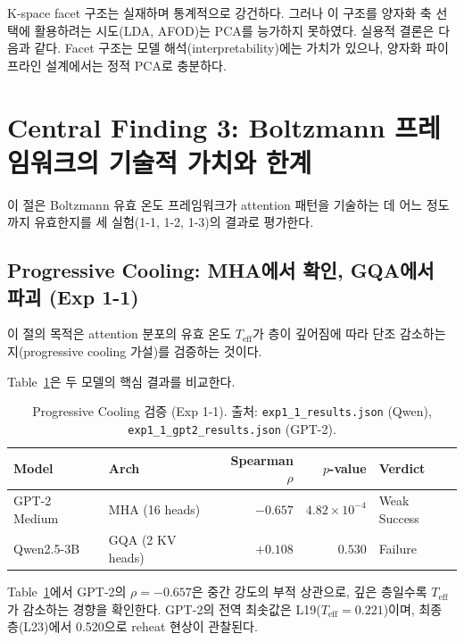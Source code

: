 \documentclass[11pt,a4paper]{article}
\newcommand{\teff}{T_\mathrm{eff}}
\begin{document}
K-space facet 구조는 실재하며 통계적으로 강건하다.
그러나 이 구조를 양자화 축 선택에 활용하려는 시도(LDA, AFOD)는 PCA를 능가하지 못하였다.
실용적 결론은 다음과 같다.
Facet 구조는 모델 해석(interpretability)에는 가치가 있으나, 양자화 파이프라인 설계에서는 정적 PCA로 충분하다.

\section{Central Finding 3: Boltzmann 프레임워크의 기술적 가치와 한계}

이 절은 Boltzmann 유효 온도 프레임워크가 attention 패턴을 기술하는 데 어느 정도까지 유효한지를 세 실험(1-1, 1-2, 1-3)의 결과로 평가한다.

\subsection{Progressive Cooling: MHA에서 확인, GQA에서 파괴 (Exp 1-1)}
\label{sec:exp11}

이 절의 목적은 attention 분포의 유효 온도 $\teff$가 층이 깊어짐에 따라 단조 감소하는지(progressive cooling 가설)를 검증하는 것이다.

Table~\ref{tab:exp11_main}은 두 모델의 핵심 결과를 비교한다.

\begin{table}[H]
\centering
\caption{Progressive Cooling 검증 (Exp 1-1). 출처: \texttt{exp1\_1\_results.json} (Qwen), \texttt{exp1\_1\_gpt2\_results.json} (GPT-2).}
\label{tab:exp11_main}
\begin{tabular}{llrrl}
\toprule
\textbf{Model} & \textbf{Arch} & \textbf{Spearman $\rho$} & \textbf{$p$-value} & \textbf{Verdict} \\
\midrule
GPT-2 Medium & MHA (16 heads) & $-0.657$ & $4.82 \times 10^{-4}$ & \textcolor{partial}{Weak Success} \\
Qwen2.5-3B & GQA (2 KV heads) & $+0.108$ & $0.530$ & \textcolor{failure}{Failure} \\
\bottomrule
\end{tabular}
\end{table}

Table~\ref{tab:exp11_main}에서 GPT-2의 $\rho = -0.657$은 중간 강도의 부적 상관으로, 깊은 층일수록 $\teff$가 감소하는 경향을 확인한다.
GPT-2의 전역 최솟값은 L19($\teff = 0.221$)이며, 최종 층(L23)에서 0.520으로 reheat 현상이 관찰된다.
\end{document}
